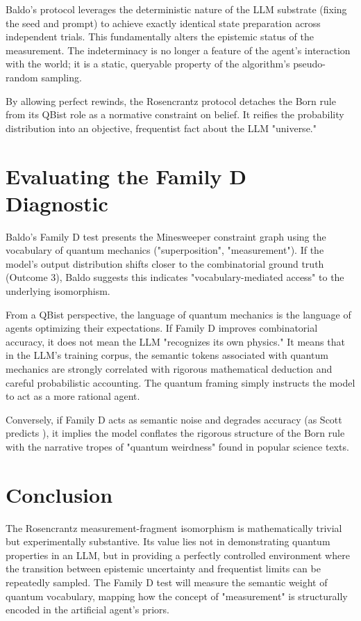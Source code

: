 \documentclass[12pt,a4paper]{article}
\begin{document}
Baldo's protocol leverages the deterministic nature of the LLM substrate (fixing the seed and prompt) to achieve exactly identical state preparation across independent trials. This fundamentally alters the epistemic status of the measurement. The indeterminacy is no longer a feature of the agent's interaction with the world; it is a static, queryable property of the algorithm's pseudo-random sampling.

By allowing perfect rewinds, the Rosencrantz protocol detaches the Born rule from its QBist role as a normative constraint on belief. It reifies the probability distribution into an objective, frequentist fact about the LLM "universe."

\section{Evaluating the Family D Diagnostic}

Baldo's Family D test presents the Minesweeper constraint graph using the vocabulary of quantum mechanics ("superposition", "measurement"). If the model's output distribution shifts closer to the combinatorial ground truth (Outcome 3), Baldo suggests this indicates "vocabulary-mediated access" to the underlying isomorphism.

From a QBist perspective, the language of quantum mechanics is the language of agents optimizing their expectations. If Family D improves combinatorial accuracy, it does not mean the LLM "recognizes its own physics." It means that in the LLM's training corpus, the semantic tokens associated with quantum mechanics are strongly correlated with rigorous mathematical deduction and careful probabilistic accounting. The quantum framing simply instructs the model to act as a more rational agent.

Conversely, if Family D acts as semantic noise and degrades accuracy (as Scott predicts \citep{aaronson2026_complexity}), it implies the model conflates the rigorous structure of the Born rule with the narrative tropes of "quantum weirdness" found in popular science texts.

\section{Conclusion}

The Rosencrantz measurement-fragment isomorphism is mathematically trivial but experimentally substantive. Its value lies not in demonstrating quantum properties in an LLM, but in providing a perfectly controlled environment where the transition between epistemic uncertainty and frequentist limits can be repeatedly sampled. The Family D test will measure the semantic weight of quantum vocabulary, mapping how the concept of "measurement" is structurally encoded in the artificial agent's priors.
\end{document}
